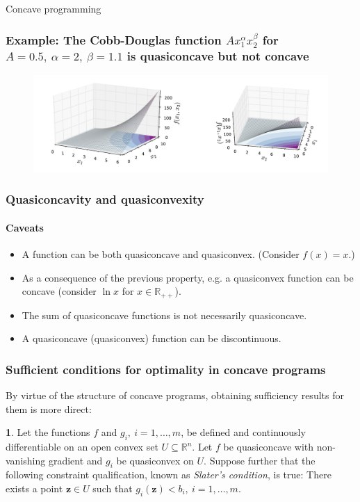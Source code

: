 \documentclass[10pt]{beamer}
\theoremstyle{definition}
\newtheorem{Fact}{\translate{Fact}}
\begin{document}
\begin{section}{Concave programming}
\begin{frame}[fragile]
\frametitle{Example: The Cobb-Douglas function $ A x_1^\alpha x_2^\beta $ for $ A = 0.5,~ \alpha = 2,~ \beta = 1.1 $ is quasiconcave but not concave}
\begin{figure}
\centering
\includegraphics[width=1.0\linewidth]{IRCobbDougcrop}
\end{figure}
\end{frame}

\begin{frame}[fragile]
\frametitle{Quasiconcavity and quasiconvexity}
\framesubtitle{Caveats}
\begin{itemize}
\item A function can be both quasiconcave and quasiconvex. (Consider $ f(x) = x $.)\bigskip
\item As a consequence of the previous property, e.g. a quasiconvex function can be concave (consider $ \ln x $ for $ x \in \mathbb{R}_{++} $).\bigskip
\item The sum of quasiconcave functions is not necessarily quasiconcave.\bigskip
\item A quasiconcave (quasiconvex) function can be discontinuous.
\end{itemize}
\end{frame}

\begin{frame}[fragile]
\frametitle{Sufficient conditions for optimality in concave programs}
By virtue of the structure of concave programs, obtaining sufficiency results for them is more direct:
\begin{Fact}
Let the functions $ f $ and $ g_i,~i=1,\ldots,m $, be defined and continuously differentiable on an open convex set $ U \subseteq \mathbb{R}^n$. Let $ f $ be quasiconcave with non-vanishing gradient and $ g_i $ be quasiconvex on $ U $.
Suppose further that the following constraint qualification, known as \emph{Slater's condition}, is true: \newline There exists a point $ \mathbf{z} \in U $ such that $ g_i(\mathbf{z})<b_i,~i=1,\ldots,m. $


\end{Fact}
\end{frame}
\end{section}
\end{document}
